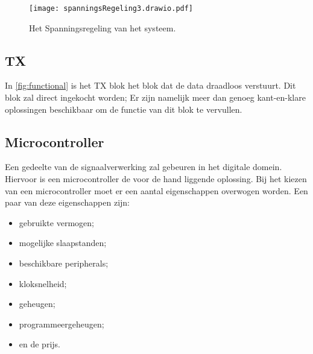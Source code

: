 \begin{figure}[ht]
    \centering
    \texttt{[image: spanningsRegeling3.drawio.pdf]}
    \caption{Het Spanningsregeling van het systeem.}
    \label{fig:spanningsregeling}
\end{figure}

\subsection{TX}
In \autoref{fig:functional} is het TX blok het blok dat de data draadloos verstuurt. Dit blok zal direct ingekocht worden; Er zijn namelijk meer dan genoeg kant-en-klare oplossingen beschikbaar om de functie van dit blok te vervullen.


\subsection{Microcontroller}
Een gedeelte van de signaalverwerking zal gebeuren in het digitale domein. Hiervoor is een microcontroller de voor de hand liggende oplossing. Bij het kiezen van een microcontroller moet er een aantal eigenschappen overwogen worden. Een paar van deze eigenschappen zijn:
\begin{itemize}
    \item gebruikte vermogen;
    \item mogelijke slaapstanden;
    \item beschikbare peripherals;
    \item kloksnelheid;
    \item geheugen;
    \item programmeergeheugen;
    \item en de prijs.
\end{itemize}
